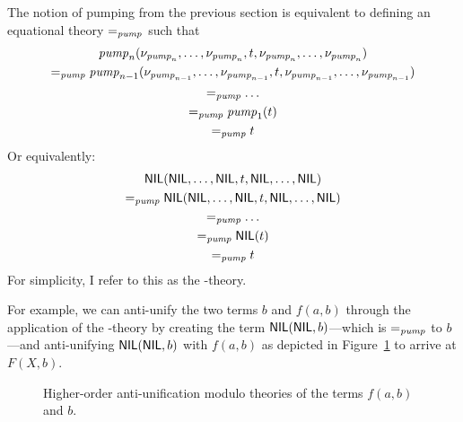The notion of pumping from the previous section is equivalent to defining an equational theory $=_{\mathit{pump}}$ such that 
\begin{gather*}
\mathit{pump}_n(\nu_{\mathit{pump}_n}, \ldots, \nu_{\mathit{pump}_n}, t, \nu_{\mathit{pump}_n}, \ldots, \nu_{\mathit{pump}_n})\\
=_{\mathit{pump}} \mathit{pump}_{n-1}(\nu_{\mathit{pump}_{n-1}}, \ldots, \nu_{\mathit{pump}_{n-1}}, t, \nu_{\mathit{pump}_{n-1}}, \ldots, \nu_{\mathit{pump}_{n-1}})\\
=_{\mathit{pump}} \ldots\\
=_{\mathit{pump}} \mathit{pump}_1(t)\\
=_{\mathit{pump}} t
\end{gather*}
Or equivalently:
\begin{gather*}
\textsf{NIL}(\textsf{NIL}, \ldots, \textsf{NIL}, t, \textsf{NIL}, \ldots, \textsf{NIL})\\
=_{\mathit{pump}} \textsf{NIL}(\textsf{NIL}, \ldots, \textsf{NIL}, t, \textsf{NIL}, \ldots, \textsf{NIL})\\
=_{\mathit{pump}} \ldots\\
=_{\mathit{pump}} \textsf{NIL}(t)\\
=_{\mathit{pump}} t
\end{gather*}
For simplicity, I refer to this as the \NIL{}-theory. 

For example, we can anti-unify the two terms $b$ and $f(a,b)$ through the application of the \NIL{}-theory by creating the term $\textsf{NIL}(\textsf{NIL},b)$---which is $=_{\mathit{pump}}$ to $b$---and anti-unifying $\textsf{NIL}(\textsf{NIL},b)$ with $f(a,b)$ as depicted in Figure~\ref{fig:anti-nil} to arrive at $F(X, b)$.


\begin{figure}[t]
\centering{}
\caption{Higher-order anti-unification modulo theories of the terms $f(a, b)$ and $b$.\label{fig:anti-nil}}
\end{figure}


